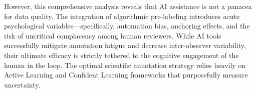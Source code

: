 \documentclass[conference]{IEEEtran}
\begin{document}
However, this comprehensive analysis reveals that AI assistance is not a panacea for data quality. The integration of algorithmic pre-labeling introduces acute psychological variables---specifically, automation bias, anchoring effects, and the risk of uncritical complacency among human reviewers. While AI tools successfully mitigate annotation fatigue and decrease inter-observer variability, their ultimate efficacy is strictly tethered to the cognitive engagement of the human in the loop. The optimal scientific annotation strategy relies heavily on Active Learning and Confident Learning frameworks that purposefully measure uncertainty.

\nocite{*}


\end{document}
